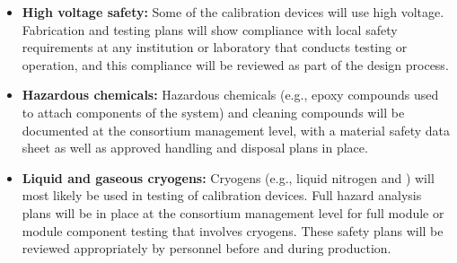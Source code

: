 \begin{itemize}
\item {\bf High voltage safety:} Some of the calibration devices will use high voltage. Fabrication and testing plans will show compliance with local  safety requirements at any institution or laboratory that conducts testing or operation, and this compliance will be reviewed as part of the design process.

\item {\bf Hazardous chemicals:} Hazardous chemicals (e.g., epoxy compounds used to attach components of the system) and cleaning compounds will be documented at the consortium management level, with a material safety data sheet as well as approved handling and disposal plans in place.

\item {\bf Liquid and gaseous cryogens:} Cryogens (e.g., liquid nitrogen and ) will most likely be used in testing of calibration devices. Full hazard analysis plans will be in place at the consortium management level for full module or module component testing that involves cryogens. These safety plans will be reviewed appropriately by   personnel before and during production.

\end{itemize}

